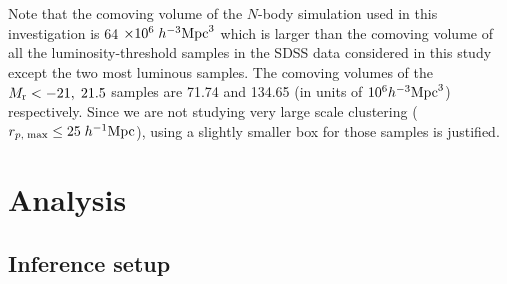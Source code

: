 \documentclass[twocolumn]{aastex61}
\begin{document}
Note that the comoving volume of the $N$-body simulation used in this investigation is 64 $\times 10^{6} \; h^{-3}\rm{Mpc}^{3}$ which is larger than the comoving volume of all the luminosity-threshold samples in the SDSS data considered in this study except the two most luminous samples. The comoving volumes of the $M_{\rm r}<-21, \; 21.5$ samples are 71.74 and 134.65 (in units of $10^{6} h^{-3}\rm{Mpc}^{3}$) respectively. Since we are not studying very large scale clustering ($r_{p,\; \rm max} \leq 25 \; h^{-1}\rm{Mpc}$), using a slightly smaller box for those samples is justified. 

\section{Analysis}\label{sec:analysis}

\subsection{Inference setup}\label{subsec:analysis}
\end{document}
